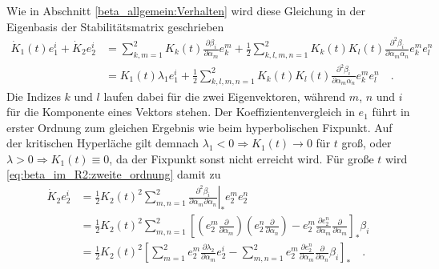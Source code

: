    Wie in Abschnitt \ref{beta_allgemein:Verhalten} wird diese Gleichung in 
    der Eigenbasis der Stabilitätsmatrix geschrieben
    \begin{align}
     \dot{K}_1 (t) e_1^i +\dot{K}_2 e_2^i &= \sum\limits_{k,m=1}^2
     K_k(t) \frac{\partial \beta _i}{\partial \alpha_m} e_k^m 
     + \frac12 \sum\limits_{k,l,m,n=1}^2
     K_k(t)K_l(t)\frac{\partial^2 \beta _i}{\partial \alpha_m \alpha_n}e_k^m  
     e_l^n \\
     &= K_1(t)\lambda_1 e_1^i  + \frac12 \sum\limits_{k,l,m,n=1}^2
     K_k(t)K_l(t)\frac{\partial^2 \beta _i}{\partial \alpha_m \alpha_n}e_k^m  
     e_l^n 
     \quad . \label{eq:beta_im_R2:zweite_ordnung}
    \end{align}
    Die Indizes $k$ und $l$ laufen dabei für die zwei Eigenvektoren, während 
    $m$, $n$ und $i$ für die Komponente eines Vektors stehen. Der 
    Koeffizientenvergleich in $e_1$ führt in erster Ordnung zum gleichen 
    Ergebnis wie beim hyperbolischen Fixpunkt. Auf der kritischen Hyperläche 
    gilt demnach $\lambda_1<0 \Rightarrow K_1(t)\rightarrow 0$ für $t$ groß, 
    oder $\lambda>0 \Rightarrow K_1(t)\equiv 0$, da der Fixpunkt sonst nicht 
    erreicht wird. Für große $t$ wird \eqref{eq:beta_im_R2:zweite_ordnung} 
    damit zu 
    \begin{align}
     \dot{K}_2 e_2^i &= \frac{1}{2} K_2(t)^2 \sum\limits_{m,n=1}^2 
     \left.\frac{\partial^2 \beta_i}{\partial \alpha_m \partial \alpha_n}
     \right|_* e_2^m e_2^n
     \\&= \frac12 K_2(t)^2 \sum\limits_{m,n=1}^2 \left[ \left(e_2^m 
     \frac{\partial}{\partial \alpha_m} \right) 
     \left(e_2^n \frac{\partial}{\partial \alpha_n} \right) - e_2^m 
     \frac{\partial e_2^n}{\partial \alpha_m} \frac{\partial}{\partial \alpha_m}
     \right]_* \beta_i \\
     &= \frac12 K_2(t)^2 \left[ \sum\limits_{m=1}^2 e_2^m 
     \frac{\partial\lambda_2}{\partial \alpha_m}e_2^i - \sum\limits_{m,n=1}^2 
     e_2^m \frac{\partial e_2^n}{\partial \alpha_m} 
     \frac{\partial}{\partial \alpha_n} \beta_i \right]_* \quad . 
     \label{eq:beta_im_R2:mischterm}
    \end{align}
